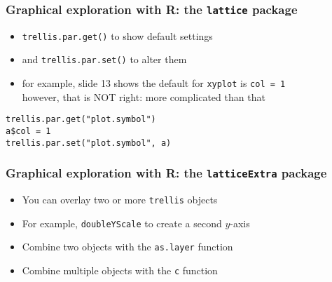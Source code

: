 \documentclass[11pt,pdftex,dvipsnames,usenames,helvetica]{beamer}
\begin{document}
\begin{frame}[fragile]
\frametitle{Graphical exploration with R: the {\tt lattice} package}
\begin{itemize}
\item {\tt trellis.par.get()} to show default settings
\item and {\tt trellis.par.set()} to alter them
\item for example, slide 13 shows the default for {\tt xyplot}
is {\tt col = 1}\\
however, that is NOT right: more complicated than that
\end{itemize}
\begin{verbatim}
trellis.par.get("plot.symbol")
a$col = 1
trellis.par.set("plot.symbol", a)
\end{verbatim}
\end{frame}

\begin{frame}[fragile]
\frametitle{Graphical exploration with R: the {\tt latticeExtra} package}
\begin{itemize}
\item You can overlay two or more {\tt trellis} objects
\item For example, {\tt doubleYScale} to create a second $y$-axis
\item Combine two objects with the {\tt as.layer} function
\item Combine multiple objects with the {\tt c} function
\end{itemize}
\end{frame}
\end{document}
